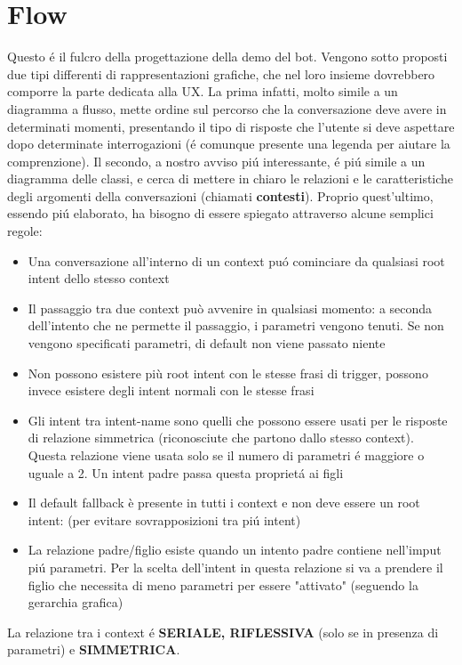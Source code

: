 \documentclass[]{article}
\begin{document}
\section{Flow}
Questo é il fulcro della progettazione della demo del bot. Vengono sotto proposti due tipi differenti di rappresentazioni grafiche, che nel loro insieme dovrebbero comporre la parte dedicata alla UX. La prima infatti, molto simile a un diagramma a flusso, mette ordine sul percorso che la conversazione deve avere in determinati momenti, presentando il tipo di risposte che l'utente si deve aspettare dopo determinate interrogazioni (é comunque presente una legenda per aiutare la comprenzione). Il secondo, a nostro avviso piú interessante, é piú simile a un diagramma delle classi, e cerca di mettere in chiaro le relazioni e le caratteristiche degli argomenti della conversazioni (chiamati \textbf{contesti}). Proprio quest'ultimo, essendo piú elaborato, ha bisogno di essere spiegato attraverso alcune semplici regole:

\begin{itemize}
\item Una conversazione all'interno di un context puó cominciare da qualsiasi root intent dello stesso context
\item Il passaggio tra due context può avvenire in qualsiasi momento: a seconda dell'intento che ne permette il passaggio, i parametri vengono tenuti. Se non vengono specificati parametri, di default non viene passato niente
\item Non possono esistere più root intent con le stesse frasi di trigger, possono invece esistere degli intent normali con le stesse frasi
\item Gli intent tra intent-name sono quelli che possono essere usati per le risposte di relazione simmetrica (riconosciute che partono dallo stesso context). Questa relazione viene usata solo se il numero di parametri é maggiore o uguale a 2. Un intent padre passa questa proprietá ai figli
\item Il default fallback è presente in tutti i context e non deve essere un root intent: (per evitare sovrapposizioni tra piú intent)
\item La relazione padre/figlio esiste quando un intento padre contiene nell'imput piú parametri. Per la scelta dell'intent in questa relazione si va a prendere il figlio che necessita di meno parametri per essere "attivato" (seguendo la gerarchia grafica)
\end{itemize}

La relazione tra i context é \textbf{SERIALE, RIFLESSIVA} (solo se in presenza di parametri) e \textbf{SIMMETRICA}.
\end{document}
